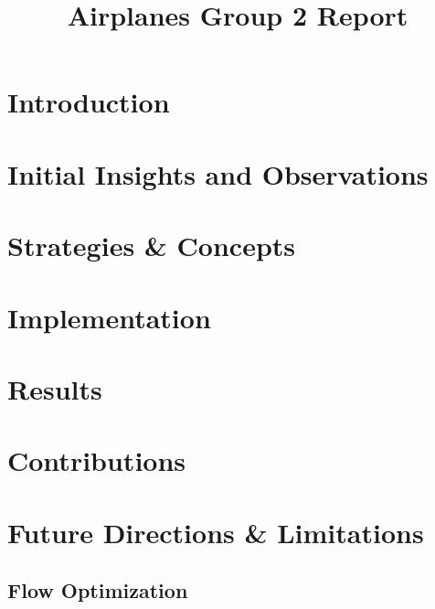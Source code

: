 \documentclass[10pt]{article}
\title{Airplanes Group 2 Report}
\author{\myname}
\begin{document}
\pagestyle{empty}
\maketitle

\newpage
\pagestyle{fancy}
\setlength\headheight{60pt}
\setcounter{tocdepth}{3}
\tableofcontents

\newpage
\section{Introduction}

\newpage
\section{Initial Insights and Observations}

\newpage
\section{Strategies \& Concepts}

\newpage
\section{Implementation}

\newpage
\section{Results}

\newpage
\section{Contributions}

\newpage
\section{Future Directions \& Limitations}

\subsection{Flow Optimization}
\end{document}
